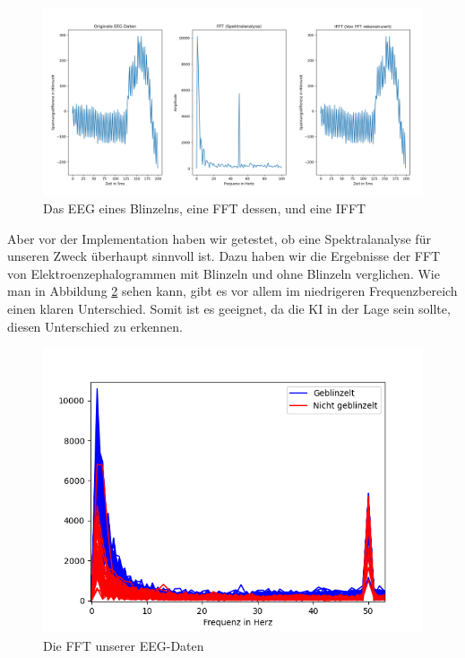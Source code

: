 \documentclass{scrartcl}
\begin{document}
	\begin{figure}[h!]
		\includegraphics[width=\textwidth]{pictures/blink_fft_ifft.png}
		\caption{Das EEG eines Blinzelns, eine FFT dessen, und eine IFFT}
		\label{EEG-IFFT}
	\end{figure}

	Aber vor der Implementation haben wir getestet, ob eine Spektralanalyse für unseren Zweck überhaupt sinnvoll ist. Dazu haben wir die Ergebnisse der FFT von Elektroenzephalogrammen mit Blinzeln und ohne Blinzeln verglichen. Wie man in Abbildung \ref{EEG-FFT} sehen kann, gibt es vor allem im niedrigeren Frequenzbereich einen klaren Unterschied. %
	Somit ist es geeignet, da die KI in der Lage sein sollte, diesen Unterschied zu erkennen.

	\begin{figure}[h!]
		\includegraphics[width=\textwidth]{pictures/Die_FFTs_der_EEG-Daten.png}
		\caption{Die FFT unserer EEG-Daten}
		\label{EEG-FFT}
	\end{figure}
	
\end{document}
